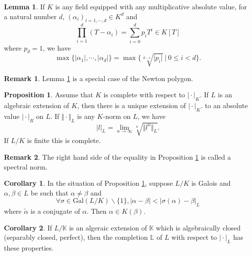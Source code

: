 \documentclass[10pt]{article}
\numberwithin{equation}{section}
\theoremstyle{definition}
\newtheorem{proposition}{Proposition}[subsection]
\newtheorem{lemma}{Lemma}[subsection]
\newtheorem{remark}{Remark}[subsection]
\newtheorem{corollary}{Corollary} [subsection]
\newcommand{\norm}[1]{\Vert #1 \Vert}
\newcommand{\sep}[0]{\:|\:}
\newcommand{\ab}[1]{\vert #1 \vert}
\begin{document}
\begin{lemma}
    If $K$ is any field equipped with any multiplicative absolute value, for a natural number $d$, $(\alpha_i)_{i=1,\cdots,d}\in K^d$ and 
    \begin{equation*}
        \prod_{i=1}^d(T-\alpha_i) = \sum_{i=0}^d p_iT^i\in K[T]
    \end{equation*}
    where $p_d=1$, we have 
    \begin{equation*}
        \max\{\ab{\alpha_1},\cdots,\ab{\alpha_d}\}=\max\{\sqrt[d-i]{\ab{p_i}}\sep 0\leq i<d\}.
    \end{equation*}
    \label{lemma_28_1}
\end{lemma}
\begin{remark}
    Lemma \ref{lemma_28_1} is a special case of the Newton polygon.
\end{remark}

\begin{proposition}
    \label{proposition_28_2_1}
    Assume that $K$ is complete with respect to $\ab{\cdot}_K$. If $L$ is an algebraic extension of $K$, then there is a unique extension of $\ab{\cdot}_K$. to an absolute value $\ab{\cdot}_R$ on $L$. If $\norm{\cdot}_L$ is any $K$-norm on $L$, we have 
    \begin{equation*}
        \ab{l}_L=\lim_{n\to\infty}\sqrt[n]{\norm{l^n}_L}.
    \end{equation*}
    If $L/K$ is finite this is complete.
\end{proposition}

\begin{remark}
    The right hand side of the equality in Proposition \ref{proposition_28_2_1} is called a spectral norm.
\end{remark}

\begin{corollary}
    In the situation of Proposition \ref{proposition_28_2_1}, suppose $L/K$ is Galois and $\alpha,\beta\in L$ be such that $\alpha\not=\beta$ and 
    \begin{equation*}
        \forall \sigma\in\mathrm{Gal}(L/K)\backslash\{1\}, \ab{\alpha-\beta}<\ab{\sigma(\alpha)-\beta}_L
    \end{equation*}
    where $\tilde{\alpha}$ is a conjugate of $\alpha$. Then $\alpha\in K(\beta)$.
\end{corollary}

\begin{corollary}
    If $L/\mathbb{K}$ is an algeraic extension of $\mathbb{K}$ which is algebraically closed (separably closed, perfect), then the completion $\mathbb{L}$ of $L$ with respect to $\ab{\cdot}_L$ has these properties.
\end{corollary}
\end{document}
